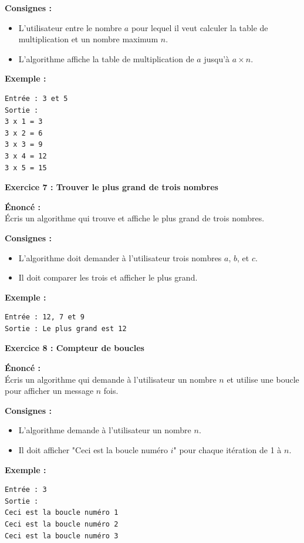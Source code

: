 \documentclass{article}
\begin{document}
\begin{tcolorbox}[colback=green!10!white, colframe=yellow!75!black, title=\textcolor{white}{Exercices}]
\textbf{Consignes :}
\begin{itemize}
    \item L'utilisateur entre le nombre \( a \) pour lequel il veut calculer la table de multiplication et un nombre maximum \( n \).
    \item L'algorithme affiche la table de multiplication de \( a \) jusqu'à \( a \times n \).
\end{itemize}

\textbf{Exemple :}
\begin{verbatim}
Entrée : 3 et 5
Sortie :
3 x 1 = 3
3 x 2 = 6
3 x 3 = 9
3 x 4 = 12
3 x 5 = 15
\end{verbatim}
\end{tcolorbox}

\begin{tcolorbox}[colback=green!10!white, colframe=yellow!75!black, title=\textcolor{white}{Exercices}]

\textbf{Exercice 7 : Trouver le plus grand de trois nombres}

\textbf{Énoncé :} \\
Écris un algorithme qui trouve et affiche le plus grand de trois nombres.

\textbf{Consignes :}
\begin{itemize}
    \item L'algorithme doit demander à l'utilisateur trois nombres \( a \), \( b \), et \( c \).
    \item Il doit comparer les trois et afficher le plus grand.
\end{itemize}

\textbf{Exemple :}
\begin{verbatim}
Entrée : 12, 7 et 9
Sortie : Le plus grand est 12
\end{verbatim}

\vspace{0.5cm}

\textbf{Exercice 8 : Compteur de boucles}

\textbf{Énoncé :} \\
Écris un algorithme qui demande à l'utilisateur un nombre \( n \) et utilise une boucle pour afficher un message \( n \) fois.

\textbf{Consignes :}
\begin{itemize}
    \item L'algorithme demande à l'utilisateur un nombre \( n \).
    \item Il doit afficher "Ceci est la boucle numéro \( i \)" pour chaque itération de 1 à \( n \).
\end{itemize}

\textbf{Exemple :}
\begin{verbatim}
Entrée : 3
Sortie :
Ceci est la boucle numéro 1
Ceci est la boucle numéro 2
Ceci est la boucle numéro 3
\end{verbatim}
\end{tcolorbox}
\end{document}
